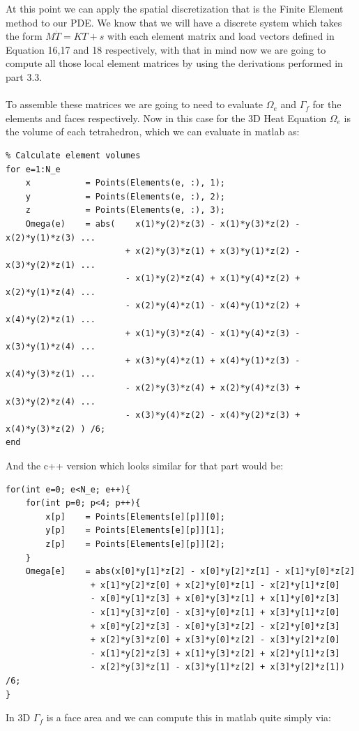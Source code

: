 \documentclass[12pt]{article}
\begin{document}
At this point we can apply the spatial discretization that is the Finite Element method to our PDE. We know that we will have a discrete system which takes the form $M\dot{T} = KT + s$ with each element matrix and load vectors defined in Equation 16,17 and 18 respectively, with that in mind now we are going to compute all those local element matrices by using the derivations performed in part 3.3.
\\\\
To assemble these matrices we are going to need to evaluate $\Omega_e$ and $\Gamma_f$ for the elements and faces respectively. Now in this case for the 3D Heat Equation $\Omega_e$ is the volume of each tetrahedron, which we can evaluate in matlab as:

\begin{lstlisting}
% Calculate element volumes
for e=1:N_e	
	x           = Points(Elements(e, :), 1);
	y           = Points(Elements(e, :), 2);
	z           = Points(Elements(e, :), 3);
	Omega(e)	= abs(    x(1)*y(2)*z(3) - x(1)*y(3)*z(2) - x(2)*y(1)*z(3) ...
						+ x(2)*y(3)*z(1) + x(3)*y(1)*z(2) - x(3)*y(2)*z(1) ...
						- x(1)*y(2)*z(4) + x(1)*y(4)*z(2) + x(2)*y(1)*z(4) ...
						- x(2)*y(4)*z(1) - x(4)*y(1)*z(2) + x(4)*y(2)*z(1) ...
						+ x(1)*y(3)*z(4) - x(1)*y(4)*z(3) - x(3)*y(1)*z(4) ...
						+ x(3)*y(4)*z(1) + x(4)*y(1)*z(3) - x(4)*y(3)*z(1) ...
						- x(2)*y(3)*z(4) + x(2)*y(4)*z(3) + x(3)*y(2)*z(4) ...
						- x(3)*y(4)*z(2) - x(4)*y(2)*z(3) + x(4)*y(3)*z(2) ) /6;
end
\end{lstlisting}

And the c++ version which looks similar for that part would be:

\begin{lstlisting}[style=MyC++Style]
for(int e=0; e<N_e; e++){
	for(int p=0; p<4; p++){
		x[p]	= Points[Elements[e][p]][0];
		y[p]	= Points[Elements[e][p]][1];
		z[p]	= Points[Elements[e][p]][2];
	}
	Omega[e]    = abs(x[0]*y[1]*z[2] - x[0]*y[2]*z[1] - x[1]*y[0]*z[2]
				 + x[1]*y[2]*z[0] + x[2]*y[0]*z[1] - x[2]*y[1]*z[0]
				 - x[0]*y[1]*z[3] + x[0]*y[3]*z[1] + x[1]*y[0]*z[3]
				 - x[1]*y[3]*z[0] - x[3]*y[0]*z[1] + x[3]*y[1]*z[0]
				 + x[0]*y[2]*z[3] - x[0]*y[3]*z[2] - x[2]*y[0]*z[3]
				 + x[2]*y[3]*z[0] + x[3]*y[0]*z[2] - x[3]*y[2]*z[0]
				 - x[1]*y[2]*z[3] + x[1]*y[3]*z[2] + x[2]*y[1]*z[3]
				 - x[2]*y[3]*z[1] - x[3]*y[1]*z[2] + x[3]*y[2]*z[1]) /6;
}
\end{lstlisting}

In 3D $\Gamma_f$ is a face area and we can compute this in matlab quite simply via:
\end{document}
